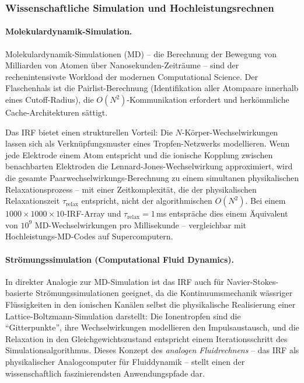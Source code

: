 ﻿\documentclass[a4paper,12pt]{scrreprt}
\theoremstyle{definition}
\begin{document}
\subsubsection{Wissenschaftliche Simulation und Hochleistungsrechnen}
\label{subsubsec:hpc}

\paragraph{Molekulardynamik-Simulation.}
Molekulardynamik-Simulationen (MD) -- die Berechnung der Bewegung von
Milliarden von Atomen über Nanosekunden-Zeiträume -- sind der
rechenintensivste Workload der modernen Computational Science.
Der Flaschenhals ist die Pairlist-Berechnung (Identifikation aller
Atompaare innerhalb eines Cutoff-Radius), die $O(N^2)$-Kommunikation
erfordert und herkömmliche Cache-Architekturen sättigt.

Das IRF bietet einen strukturellen Vorteil: Die $N$-Körper-Wechselwirkungen
lassen sich als Verknüpfungsmuster eines Tropfen-Netzwerks modellieren.
Wenn jede Elektrode einem Atom entspricht und die ionische Kopplung
zwischen benachbarten Elektroden die Lennard-Jones-Wechselwirkung
approximiert, wird die gesamte Paarwechselwirkungs-Berechnung zu einem
simultanen physikalischen Relaxationsprozess -- mit einer Zeitkomplexität,
die der physikalischen Relaxationszeit $\tau_\text{relax}$ entspricht,
nicht der algorithmischen $O(N^2)$. Bei einem $1000 \times 1000 \times 10$-IRF-Array
und $\tau_\text{relax} = 1$\,ms entspräche dies einem Äquivalent von
$10^9$ MD-Wechselwirkungen pro Millisekunde -- vergleichbar mit
Hochleistungs-MD-Codes auf Supercomputern.

\paragraph{Strömungssimulation (Computational Fluid Dynamics).}
In direkter Analogie zur MD-Simulation ist das IRF auch für
Navier-Stokes-basierte Strömungssimulationen geeignet, da die
Kontinuumsmechanik wässriger Flüssigkeiten in den ionischen Kanälen
selbst die physikalische Realisierung einer Lattice-Boltzmann-Simulation
darstellt: Die Ionentropfen sind die ``Gitterpunkte'', ihre
Wechselwirkungen modellieren den Impulsaustausch, und die Relaxation
in den Gleichgewichtszustand entspricht einem Iterationsschritt des
Simulationsalgorithmus. Dieses Konzept des \emph{analogen Fluidrechnens}
-- das IRF als physikalischer Analogcomputer für Fluiddynamik -- stellt
einen der wissenschaftlich faszinierendsten Anwendungspfade dar.
\end{document}
